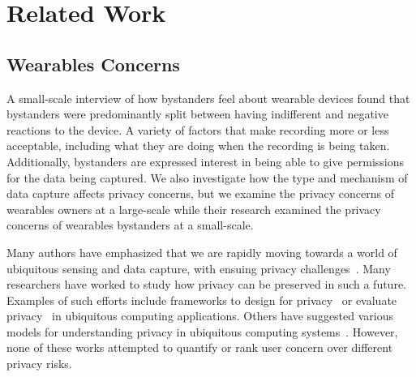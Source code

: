 
\section{Related Work}

\subsection{Wearables Concerns}
A small-scale interview of how bystanders feel about wearable devices \cite{denning2014situ} found that bystanders were predominantly split between having indifferent and negative reactions to the device. A variety of factors that make recording more or less acceptable, including what they are doing when the recording is being taken.  Additionally, bystanders are expressed interest in being able to give permissions for the data being captured. We also investigate how the type and mechanism of data capture affects privacy concerns, but we examine the privacy concerns of wearables owners at a large-scale while their research examined the privacy concerns of wearables bystanders at a small-scale. 



Many authors have emphasized that we are rapidly moving towards a world of ubiquitous sensing and data capture, with ensuing privacy challenges~\cite{abowd2000charting,palen2003unpacking,camp2000internet}. Many researchers have worked to study how privacy can be preserved in such a future. Examples of such efforts include frameworks to design for privacy~\cite{bellotti1993design,camp2003designing,langheinrich2001privacy} or evaluate privacy~\cite{scholtz2004toward} in ubiquitous computing applications. Others have suggested various models for understanding privacy in ubiquitous computing systems~\cite{hong2004privacy, jiang2002approximate}. However, none of these works attempted to quantify or rank user concern over different privacy risks. 

